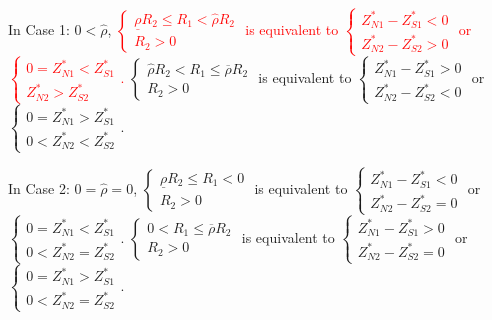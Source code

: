 \documentclass[10pt]{article}
\newcommand{\hhred}{\textcolor{red}}
\begin{document}
In Case 1: $ 0 < {\hat \rho} $, \hhred{$ \left\{ \begin{matrix} \underline{\rho} R_2 \leqslant R_1 < {\hat \rho} R_2 \\ R_2 > 0 \end{matrix} \right. $ is equivalent to $ \left\{ \begin{matrix} Z_{N 1}^* - Z_{S 1}^* < 0 \\ Z_{N 2}^* - Z_{S 2}^* > 0 \end{matrix} \right. $ or $ \left\{ \begin{matrix} 0 = Z_{N 1}^* < Z_{S 1}^* \\ Z_{N 2}^* > Z_{S 2}^* \end{matrix} \right. $.} $ \left\{ \begin{matrix} {\hat \rho} R_2 < R_1 \leqslant \overline{\rho} R_2 \\ R_2 > 0 \end{matrix} \right. $ is equivalent to $ \left\{ \begin{matrix} Z_{N 1}^* - Z_{S 1}^* > 0 \\ Z_{N 2}^* - Z_{S 2}^* < 0 \end{matrix} \right. $ or $ \left\{ \begin{matrix} 0 = Z_{N 1}^* > Z_{S 1}^* \\ 0 < Z_{N 2}^* < Z_{S 2}^* \end{matrix} \right. $.

In Case 2: $ 0 = {\hat \rho} = 0 $, $ \left\{ \begin{matrix} \underline{\rho} R_2 \leqslant R_1 < 0 \\ R_2 > 0 \end{matrix} \right. $ is equivalent to $ \left\{ \begin{matrix} Z_{N 1}^* - Z_{S 1}^* < 0 \\ Z_{N 2}^* - Z_{S 2}^* = 0 \end{matrix} \right. $ or $ \left\{ \begin{matrix} 0 = Z_{N 1}^* < Z_{S 1}^* \\ 0 < Z_{N 2}^* = Z_{S 2}^* \end{matrix} \right. $. $ \left\{ \begin{matrix} 0 < R_1 \leqslant \overline{\rho} R_2 \\ R_2 > 0 \end{matrix} \right. $ is equivalent to $ \left\{ \begin{matrix} Z_{N 1}^* - Z_{S 1}^* > 0 \\ Z_{N 2}^* - Z_{S 2}^* = 0 \end{matrix} \right. $ or $ \left\{ \begin{matrix} 0 = Z_{N 1}^* > Z_{S 1}^* \\ 0 < Z_{N 2}^* = Z_{S 2}^* \end{matrix} \right. $.
\end{document}
